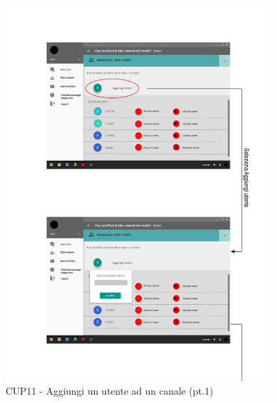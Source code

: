 \begin{figure}
	\centering
	\includegraphics[width=0.9\textwidth]{imgs/gruppo6/activities/act_cup11_aggiungi_utente_canale1.pdf}
	\caption{CUP11 - Aggiungi un utente ad un canale (pt.1)}
	\label{fig:cup11}
\end{figure}


